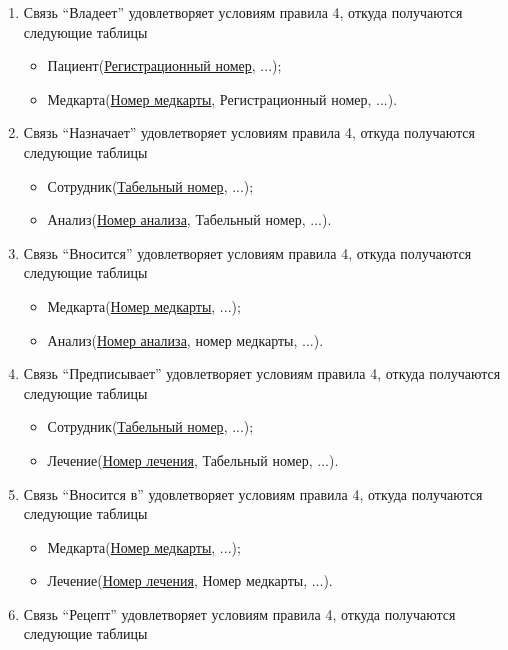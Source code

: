 \documentclass[14pt,a4paper,russian]{extreport}
\begin{document}
\begin{enumerate}[noitemsep]
    \item Связь ``Владеет'' удовлетворяет условиям правила 4, откуда получаются следующие таблицы
    \begin{itemize}[noitemsep]
            \item Пациент(\underline{Регистрационный номер}, ...);
            \item Медкарта(\underline{Номер медкарты}, Регистрационный номер, ...).
        \end{itemize}
    \item Связь ``Назначает'' удовлетворяет условиям правила 4, откуда получаются следующие
        таблицы
	\begin{itemize}[noitemsep]
            \item Сотрудник(\underline{Табельный номер}, ...);
            \item Анализ(\underline{Номер анализа}, Табельный номер, ...).
        \end{itemize}
    \item Связь ``Вносится'' удовлетворяет условиям правила 4, откуда получаются следующие
        таблицы
	\begin{itemize}[noitemsep]
            \item Медкарта(\underline{Номер медкарты}, ...);
            \item Анализ(\underline{Номер анализа}, номер медкарты, ...).
        \end{itemize}
\item Связь ``Предписывает'' удовлетворяет условиям правила 4, откуда получаются следующие
        таблицы
	\begin{itemize}[noitemsep]
            \item Сотрудник(\underline{Табельный номер}, ...);
	    \item Лечение(\underline{Номер лечения}, Табельный номер, ...).
        \end{itemize}
\item Связь ``Вносится в'' удовлетворяет условиям правила 4, откуда получаются следующие
        таблицы
	\begin{itemize}[noitemsep]
            \item Медкарта(\underline{Номер медкарты}, ...);
	    \item Лечение(\underline{Номер лечения}, Номер медкарты, ...).
        \end{itemize}
\item Связь ``Рецепт'' удовлетворяет условиям правила 4, откуда получаются следующие таблицы
    \begin{itemize}[noitemsep]

\end{itemize}
\end{enumerate}
\end{document}
